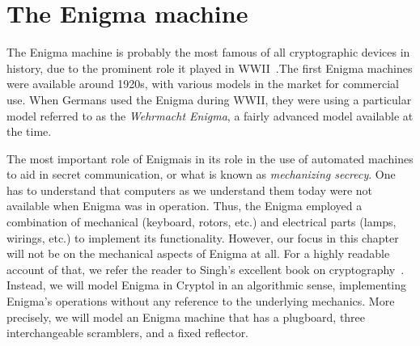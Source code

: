 \chapter{The Enigma machine}
\label{chapter:enigma}

The Enigma machine is probably the most famous of all cryptographic
devices in history, due to the prominent role it played in
WWII~\cite{wiki:enigma}.\indEnigma The first Enigma machines were
available around 1920s, with various models in the market for
commercial use. When Germans used the Enigma during WWII, they were
using a particular model referred to as the {\em Wehrmacht Enigma}, a
fairly advanced model available at the time.

The most important role of Enigma\indEnigma is in its role in the use
of automated machines to aid in secret communication, or what is known
as \emph{mechanizing secrecy}.  One has to understand that computers
as we understand them today were not available when Enigma was in
operation. Thus, the Enigma employed a combination of mechanical
(keyboard, rotors, etc.)  and electrical parts (lamps, wirings, etc.)
to implement its functionality. However, our focus in this chapter
will not be on the mechanical aspects of Enigma at all. For a highly
readable account of that, we refer the reader to Singh's excellent
book on cryptography~\cite{Singh:1999:CBE}. Instead, we will model
Enigma in Cryptol in an algorithmic sense, implementing Enigma's
operations without any reference to the underlying mechanics. More
precisely, we will model an Enigma machine that has a plugboard, three
interchangeable scramblers, and a fixed reflector.





